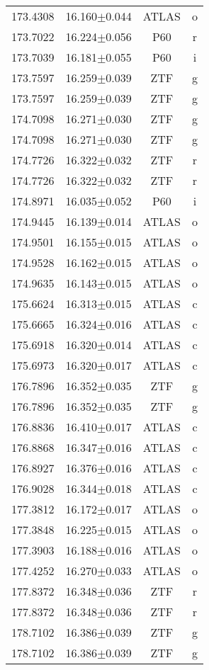 \begin{table}
\begin{tabular}{cccc}
173.4308 & 16.160$\pm$0.044 & ATLAS & o \\
173.7022 & 16.224$\pm$0.056 & P60 & r \\
173.7039 & 16.181$\pm$0.055 & P60 & i \\
173.7597 & 16.259$\pm$0.039 & ZTF & g \\
173.7597 & 16.259$\pm$0.039 & ZTF & g \\
174.7098 & 16.271$\pm$0.030 & ZTF & g \\
174.7098 & 16.271$\pm$0.030 & ZTF & g \\
174.7726 & 16.322$\pm$0.032 & ZTF & r \\
174.7726 & 16.322$\pm$0.032 & ZTF & r \\
174.8971 & 16.035$\pm$0.052 & P60 & i \\
174.9445 & 16.139$\pm$0.014 & ATLAS & o \\
174.9501 & 16.155$\pm$0.015 & ATLAS & o \\
174.9528 & 16.162$\pm$0.015 & ATLAS & o \\
174.9635 & 16.143$\pm$0.015 & ATLAS & o \\
175.6624 & 16.313$\pm$0.015 & ATLAS & c \\
175.6665 & 16.324$\pm$0.016 & ATLAS & c \\
175.6918 & 16.320$\pm$0.014 & ATLAS & c \\
175.6973 & 16.320$\pm$0.017 & ATLAS & c \\
176.7896 & 16.352$\pm$0.035 & ZTF & g \\
176.7896 & 16.352$\pm$0.035 & ZTF & g \\
176.8836 & 16.410$\pm$0.017 & ATLAS & c \\
176.8868 & 16.347$\pm$0.016 & ATLAS & c \\
176.8927 & 16.376$\pm$0.016 & ATLAS & c \\
176.9028 & 16.344$\pm$0.018 & ATLAS & c \\
177.3812 & 16.172$\pm$0.017 & ATLAS & o \\
177.3848 & 16.225$\pm$0.015 & ATLAS & o \\
177.3903 & 16.188$\pm$0.016 & ATLAS & o \\
177.4252 & 16.270$\pm$0.033 & ATLAS & o \\
177.8372 & 16.348$\pm$0.036 & ZTF & r \\
177.8372 & 16.348$\pm$0.036 & ZTF & r \\
178.7102 & 16.386$\pm$0.039 & ZTF & g \\
178.7102 & 16.386$\pm$0.039 & ZTF & g \\

\end{tabular}
\end{table}

